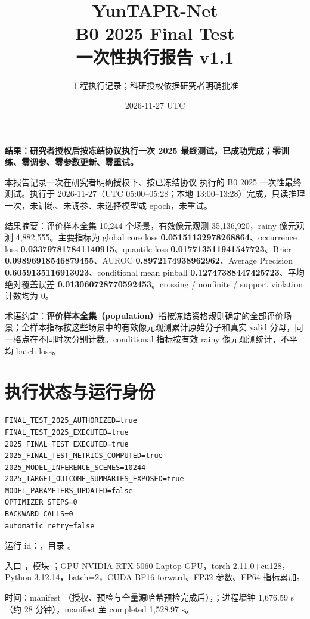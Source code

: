 \documentclass[UTF8,11pt,a4paper,fontset=windows]{ctexart}
\title{YunTAPR-Net\\B0 2025 Final Test\\一次性执行报告 v1.1}
\author{工程执行记录；科研授权依据研究者明确批准}
\date{2026-11-27 UTC}
\begin{document}
\maketitle
\textbf{结果：研究者授权后按冻结协议执行一次 2025 最终测试，已成功完成；零训练、零调参、零参数更新、零重试。}

本报告记录一次在研究者明确授权下、按已冻结协议  执行的 B0 2025 一次性最终测试。执行于 2026-11-27（UTC 05:00--05:28；本地 13:00--13:28）完成，只读推理一次，未训练、未调参、未选择模型或 epoch，未重试。

结果摘要：评价样本全集 10,244 个场景，有效像元观测 35,136,920，rainy 像元观测 4,882,555。主要指标为 global core loss \textbf{0.05151132978268864}、occurrence loss \textbf{0.033797817841140915}、quantile loss \textbf{0.017713511941547723}、Brier \textbf{0.09896918546879455}、AUROC \textbf{0.8972174938962962}、Average Precision \textbf{0.6059135116913023}、conditional mean pinball \textbf{0.12747388447425723}、平均绝对覆盖误差 \textbf{0.013060728770592453}。crossing / nonfinite / support violation 计数均为 0。

术语约定：\textbf{评价样本全集（population）}指按冻结资格规则确定的全部评价场景；全样本指标按这些场景中的有效像元观测累计原始分子和真实 valid 分母，同一格点在不同时次分别计数。conditional 指标按有效 rainy 像元观测统计，不平均 batch loss。

\section{执行状态与运行身份}
\begin{verbatim}
FINAL_TEST_2025_AUTHORIZED=true
FINAL_TEST_2025_EXECUTED=true
2025_FINAL_TEST_EXECUTED=true
2025_FINAL_TEST_METRICS_COMPUTED=true
2025_MODEL_INFERENCE_SCENES=10244
2025_TARGET_OUTCOME_SUMMARIES_EXPOSED=true
MODEL_PARAMETERS_UPDATED=false
OPTIMIZER_STEPS=0
BACKWARD_CALLS=0
automatic_retry=false
\end{verbatim}

运行 id：，目录 。

入口 ，模块 ；GPU NVIDIA RTX 5060 Laptop GPU，torch 2.11.0+cu128，Python 3.12.14，batch=2，CUDA BF16 forward、FP32 参数、FP64 指标累加。

时间：manifest （授权、预检与全量源哈希预检完成后），；进程墙钟 1,676.59 s（约 28 分钟），manifest 至 completed 1,528.97 s。
\end{document}

